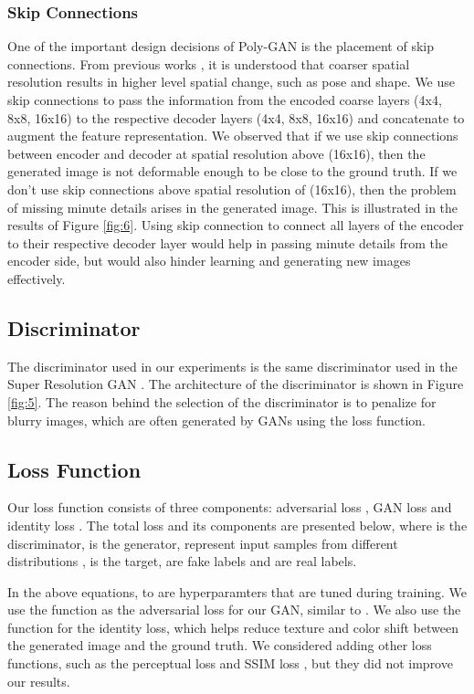 \documentclass[11pt]{article}
\begin{document}
\subsubsection{Skip Connections}
One of the important design decisions of Poly-GAN is the placement of skip connections. 
From previous works \citet{StyleGAN}, it is understood that coarser spatial resolution results in higher level spatial change, such as pose and shape. 
We use skip connections to pass the information from the encoded coarse layers (4x4, 8x8, 16x16) to the respective decoder layers (4x4, 8x8, 16x16) and concatenate to augment the feature representation. 
We observed that if we use skip connections between encoder and decoder at spatial resolution above (16x16), then the generated image is not deformable enough to be close to the ground truth. If we don't use skip connections above spatial resolution of (16x16), then the problem of missing minute details arises in the generated image. This is illustrated in the results of Figure \ref{fig:6}. 
Using skip connection to connect all layers of the encoder to their respective decoder layer would help in passing minute details from the encoder side, but would also hinder learning and generating new images effectively.

\subsection{Discriminator}
The discriminator used in our experiments is the same discriminator used in the Super Resolution GAN \citet{SRGAN}.
The architecture of the discriminator is shown in Figure \ref{fig:5}.
The reason behind the selection of the discriminator is to penalize for blurry images, which are often generated by GANs using the  loss function.

\subsection{Loss Function}
Our loss function consists of three components: adversarial loss , GAN loss  and identity loss . The total loss and its components are presented below, where  is the discriminator,  is the generator,  represent  input samples from different distributions ,  is the target,  are fake labels and  are real labels.





In the above equations, 
 to  are hyperparamters that are tuned during training.
We use the  function as the adversarial loss for our GAN, similar to \citet{LSGAN}.
We also use the  function for the identity loss, which helps reduce texture and color shift between the generated image and the ground truth. 
We considered adding other loss functions, such as the perceptual loss \citet{Perceptual-loss} and SSIM loss \citet{SSIM}, but they did not improve our results.  
\end{document}
